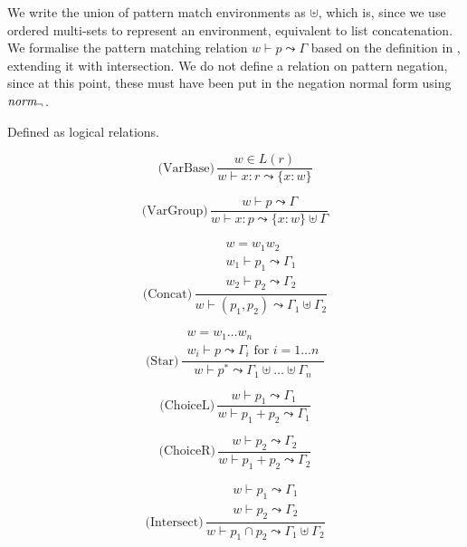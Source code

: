 We write the union of pattern match environments as $\uplus$, which is, since we
use ordered multi-sets to represent an environment, equivalent to list
concatenation. We formalise the pattern matching relation $w \vdash p \leadsto
\Gamma$ based on the definition in \cite{pdpat}, extending it with
intersection. We do not define a relation on pattern negation, since at this
point, these must have been put in the negation normal form using $\mathit{norm_\neg}$.

\begin{defn}
   Defined as logical relations.

   \begin{minipage}{0.4\textwidth}
      \[\text{(VarBase)}\, \frac
         {w \in L(r)}
         {w \vdash x : r \leadsto \{x : w\}}
      \]
   \end{minipage}
   \begin{minipage}{0.5\textwidth}
      \[\text{(VarGroup)}\, \frac
         {w \vdash p \leadsto \Gamma}
         {w \vdash x : p \leadsto \{x : w\} \uplus \Gamma}
      \]
   \end{minipage}

   \begin{minipage}{0.4\textwidth}
      \[\text{(Concat)}\, \frac
         {\begin{array}{c}
            w = w_1 w_2 \\
            w_1 \vdash p_1 \leadsto \Gamma_1 \\
            w_2 \vdash p_2 \leadsto \Gamma_2
         \end{array}}     
         {w \vdash (p_1, p_2) \leadsto \Gamma_1 \uplus \Gamma_2}
      \]
   \end{minipage}
   \begin{minipage}{0.5\textwidth}
      \[\text{(Star)}\, \frac
         {\begin{array}{c}
            w = w_1 \dots w_n \\
            w_i \vdash p \leadsto \Gamma_i \text{ for } i = 1 \dots n
         \end{array}}     
         {w \vdash p^* \leadsto \Gamma_1 \uplus \dots \uplus \Gamma_n}
      \]
   \end{minipage}

   \begin{minipage}{0.4\textwidth}
      \[\text{(ChoiceL)}\, \frac
         {w \vdash p_1 \leadsto \Gamma_1}
         {w \vdash p_1 + p_2 \leadsto \Gamma_1}
      \]
   \end{minipage}
   \begin{minipage}{0.4\textwidth}
      \[\text{(ChoiceR)}\, \frac
         {w \vdash p_2 \leadsto \Gamma_2}
         {w \vdash p_1 + p_2 \leadsto \Gamma_2}
      \]
   \end{minipage}

   \[\text{(Intersect)}\, \frac
      {\begin{array}{c}
         w \vdash p_1 \leadsto \Gamma_1 \\
         w \vdash p_2 \leadsto \Gamma_2
      \end{array}}     
      {w \vdash p_1 \cap p_2 \leadsto \Gamma_1 \uplus \Gamma_2}
   \]

\end{defn}

